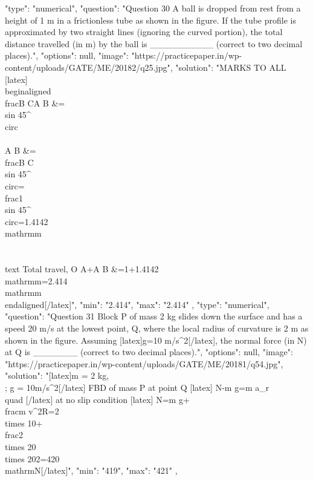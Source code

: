  {
    "type": "numerical",
    "question": "Question 30 A ball is dropped from rest from a height of 1 m in a frictionless tube as shown in the figure. If the tube profile is approximated by two straight lines (ignoring the curved portion), the total distance travelled (in m) by the ball is __________ (correct to two decimal places).",
    "options": null,
    "image": "https://practicepaper.in/wp-content/uploads/GATE/ME/20182/q25.jpg",
    "solution": "MARKS TO ALL [latex]\\begin{aligned} \\frac{B C}{A B} &=\\sin 45^{\\circ} \\\\ A B &=\\frac{B C}{\\sin 45^{\\circ}}=\\frac{1}{\\sin 45^{\\circ}}=1.4142 \\mathrm{m} \\\\ \\text { Total travel, } O A+A B &=1+1.4142 \\mathrm{m}=2.414 \\mathrm{m} \\end{aligned}[/latex]",
    "min": "2.414",
    "max": "2.414"
  },
  {
    "type": "numerical",
    "question": "Question 31 Block P of mass 2 kg slides down the surface and has a speed 20 m/s at the lowest point, Q, where the local radius of curvature is 2 m as shown in the figure. Assuming  [latex]g=10 m/s^{2}[/latex], the normal force (in N) at Q is _______ (correct to two decimal places).",
    "options": null,
    "image": "https://practicepaper.in/wp-content/uploads/GATE/ME/20181/q54.jpg",
    "solution": "[latex]m = 2 kg,\\; g = 10m/s^{2}[/latex] FBD of mass P at point Q [latex] N-m g=m a_{r} \\quad [/latex] at no slip condition [latex] N=m g+\\frac{m v^{2}}{R}=2 \\times 10+\\frac{2 \\times 20 \\times 20}{2}=420 \\mathrm{N}[/latex]",
    "min": "419",
    "max": "421"
  },
